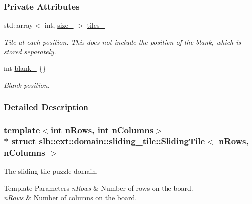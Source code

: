 \subsubsection*{Private Attributes}
\begin{DoxyCompactItemize}
\item 
std\+::array$<$ int, \hyperlink{structslb_1_1ext_1_1domain_1_1sliding__tile_1_1SlidingTile_a9a400ee0feba20908873e59620cff314}{size\+\_\+} $>$ \hyperlink{structslb_1_1ext_1_1domain_1_1sliding__tile_1_1SlidingTile_aadec60e6620cea297315e416fb11696f}{tiles\+\_\+}\hypertarget{structslb_1_1ext_1_1domain_1_1sliding__tile_1_1SlidingTile_aadec60e6620cea297315e416fb11696f}{}\label{structslb_1_1ext_1_1domain_1_1sliding__tile_1_1SlidingTile_aadec60e6620cea297315e416fb11696f}

\begin{DoxyCompactList}\small\item\em Tile at each position. This does not include the position of the blank, which is stored separately. \end{DoxyCompactList}\item 
int \hyperlink{structslb_1_1ext_1_1domain_1_1sliding__tile_1_1SlidingTile_aba25dac2bdc4e5445e3234508af9bde2}{blank\+\_\+} \{\}\hypertarget{structslb_1_1ext_1_1domain_1_1sliding__tile_1_1SlidingTile_aba25dac2bdc4e5445e3234508af9bde2}{}\label{structslb_1_1ext_1_1domain_1_1sliding__tile_1_1SlidingTile_aba25dac2bdc4e5445e3234508af9bde2}

\begin{DoxyCompactList}\small\item\em Blank position. \end{DoxyCompactList}\end{DoxyCompactItemize}


\subsubsection{Detailed Description}
\subsubsection*{template$<$int n\+Rows, int n\+Columns$>$\\*
struct slb\+::ext\+::domain\+::sliding\+\_\+tile\+::\+Sliding\+Tile$<$ n\+Rows, n\+Columns $>$}

The sliding-\/tile puzzle domain. 


\begin{DoxyTemplParams}{Template Parameters}
{\em n\+Rows} & Number of rows on the board. \\
\hline
{\em n\+Rows} & Number of columns on the board. \\
\hline
\end{DoxyTemplParams}


